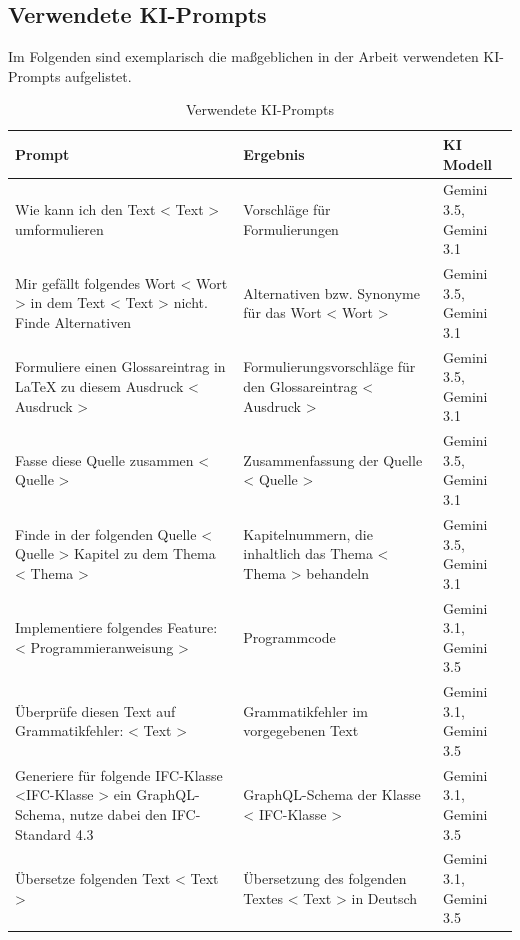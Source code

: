 \subsection{Verwendete KI-Prompts}
\label{subsec:ki_prompts}
Im Folgenden sind exemplarisch die maßgeblichen in der Arbeit verwendeten KI-Prompts aufgelistet.
\begin{table}[H]
  \centering
  \small
  \renewcommand{\arraystretch}{1.1}
  \setlength{\tabcolsep}{8pt}
  \caption{Verwendete KI-Prompts}
  \label{tab:ki_prompts}
  \begin{tabularx}{\textwidth}{L L l}
    \toprule
    \textbf{Prompt}                                                                                      & \textbf{Ergebnis}                                              & \textbf{KI Modell}     \\
    \midrule
    Wie kann ich den Text < Text > umformulieren                                                         & Vorschläge für Formulierungen                                  & Gemini 3.5, Gemini 3.1 \\ \hline
    Mir gefällt folgendes Wort < Wort > in dem Text < Text > nicht. Finde Alternativen                  & Alternativen bzw. Synonyme für das Wort < Wort >               & Gemini 3.5, Gemini 3.1 \\ \hline
    Formuliere einen Glossareintrag in LaTeX zu diesem Ausdruck < Ausdruck >               & Formulierungsvorschläge für den Glossareintrag < Ausdruck >                & Gemini 3.5, Gemini 3.1 \\ \hline
    Fasse diese Quelle zusammen < Quelle >                                                               & Zusammenfassung der Quelle < Quelle >                          & Gemini 3.5, Gemini 3.1 \\ \hline
    Finde in der folgenden Quelle < Quelle > Kapitel zu dem Thema < Thema >                              & Kapitelnummern, die inhaltlich das Thema < Thema > behandeln   & Gemini 3.5, Gemini 3.1 \\ \hline
    Implementiere folgendes Feature: < Programmieranweisung >                                            & Programmcode                                                   & Gemini 3.1, Gemini 3.5 \\ \hline
    Überprüfe diesen Text auf Grammatikfehler: < Text >                                                  & Grammatikfehler im vorgegebenen Text                           & Gemini 3.1, Gemini 3.5 \\ \hline
    Generiere für folgende IFC-Klasse <IFC-Klasse > ein GraphQL-Schema, nutze dabei den IFC-Standard 4.3 & GraphQL-Schema der Klasse < IFC-Klasse >                       & Gemini 3.1, Gemini 3.5 \\ \hline
    Übersetze folgenden Text < Text >                                                                    & Übersetzung des folgenden Textes < Text > in Deutsch           & Gemini 3.1, Gemini 3.5 \\ \hline


    \bottomrule
  \end{tabularx}
\end{table}
